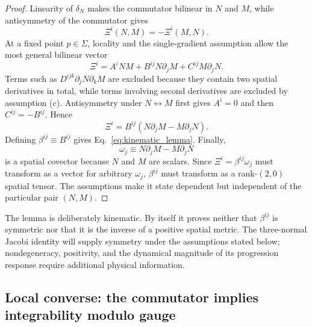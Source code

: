 \documentclass[11pt]{article}
\begin{document}
\begin{proof}
Linearity of $\delta_N$ makes the commutator bilinear in $N$ and $M$, while antisymmetry of the commutator gives
\begin{equation}
    \Xi^i(N,M)=-\Xi^i(M,N).
\end{equation}
At a fixed point $p\in\Sigma$, locality and the single-gradient assumption allow the most general bilinear vector
\begin{equation}
    \Xi^i
    =A^i NM+B^{ij}N\partial_jM+C^{ij}M\partial_jN.
    \label{eq:general_Xi}
\end{equation}
Terms such as $D^{ijk}\partial_jN\partial_kM$ are excluded because they contain two spatial derivatives in total, while terms involving second derivatives are excluded by assumption (c). Antisymmetry under $N\leftrightarrow M$ first gives $A^i=0$ and then $C^{ij}=-B^{ij}$. Hence
\begin{equation}
    \Xi^i
    =B^{ij}\left(N\partial_jM-M\partial_jN\right).
\end{equation}
Defining $\beta^{ij}\equiv B^{ij}$ gives Eq.~\eqref{eq:kinematic_lemma}. Finally,
\begin{equation}
    \omega_j\equiv N\partial_jM-M\partial_jN
\end{equation}
is a spatial covector because $N$ and $M$ are scalars. Since $\Xi^i=\beta^{ij}\omega_j$ must transform as a vector for arbitrary $\omega_j$, $\beta^{ij}$ must transform as a rank-$(2,0)$ spatial tensor. The assumptions make it state dependent but independent of the particular pair $(N,M)$.
\end{proof}

The lemma is deliberately kinematic. By itself it proves neither that $\beta^{ij}$ is symmetric nor that it is the inverse of a positive spatial metric. The three-normal Jacobi identity will supply symmetry under the assumptions stated below; nondegeneracy, positivity, and the dynamical magnitude of its progression response require additional physical information.

\subsection{Local converse: the commutator implies integrability modulo gauge}
\end{document}
